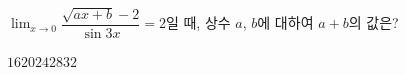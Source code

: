 $\displaystyle\lim_{x\to 0}\dfrac{\sqrt{ax+b}-2}{\sin 3x}=2$일 때, 상수 $a$, $b$에 대하여 $a+b$의 값은?
\begin{choices32}{$16$}{$20$}{$24$}{$28$}{$32$}\end{choices32}
